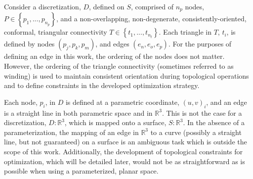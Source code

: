 Consider a discretization, $D$, defined on $S$, comprised of $n_p$
nodes, $P \in \left\{p_1,...,p_{n_p} \right\}$, and a non-overlapping,
non-degenerate, consistently-oriented, conformal, triangular
connectivity $T \in \left\{t_1,...,t_{n_t} \right\}$. Each triangle in
$T$, $t_i$, is defined by nodes $\left(p_j, p_k, p_m\right)$, and edges
$\left(e_n, e_o, e_p\right)$. For the purposes of defining an edge in this
work, the ordering of the nodes does not matter.  However, the ordering of the
triangle connectivity (sometimes referred to as winding) is used to maintain
consistent orientation during topological operations and to define constraints
in the developed optimization strategy.

Each node, $p_i$, in $D$ is defined at a parametric coordinate,
$\left(u,v\right)_i$, and an edge is a straight line in both parametric
space and in ${\mathbb R}^3$. This is not the case for a discretization,
$D:{\mathbb R}^3$, which is mapped onto a surface, $S:{\mathbb R}^3$. In the
absence of a parameterization, the mapping of an edge in ${\mathbb R}^3$ 
to a
curve (possibly a straight line, but not guaranteed) on a surface is an
ambiguous task which is outside the scope of this work.  Additionally, the
development of topological constraints for optimization, which will be detailed
later, would not be as straightforward as is possible when using a
parameterized, planar space.
